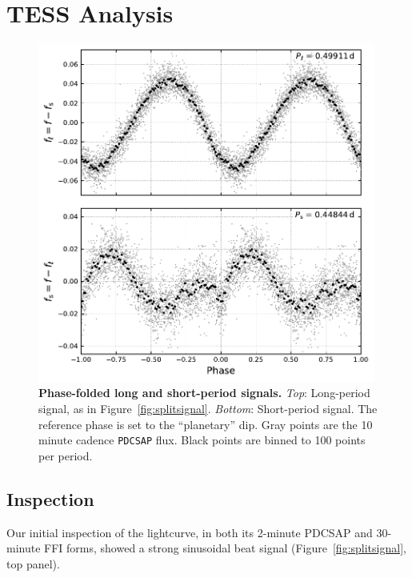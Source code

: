 \documentclass[12pt,twocolumn,tighten]{aastex62}
\begin{document}
\section{TESS Analysis}
\label{sec:tess}

\begin{figure}[t]
	\begin{center}
		\leavevmode
		\includegraphics[width=0.99\textwidth]{f3.pdf}
	\end{center}
	\vspace{-0.7cm}
	\caption{ {\bf Phase-folded long and short-period signals.}
		{\it Top}: Long-period signal, as in Figure~\ref{fig:splitsignal}.
		{\it Bottom}: Short-period signal. The reference phase is set to the
		``planetary'' dip.  Gray points are the 10 minute cadence
		\texttt{PDCSAP} flux.  Black points are binned to 100 points per
		period.
		\label{fig:phasefold}
	}
\end{figure}

\subsection{Inspection}

Our initial inspection of the lightcurve, in both its 2-minute PDCSAP
and 30-minute FFI forms, showed a strong sinusoidal beat signal
(Figure~\ref{fig:splitsignal}, top panel).
\end{document}

